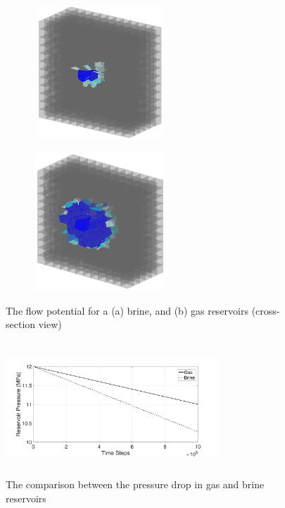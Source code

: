 \begin{figure}[!ht]
\begin{subfigure}[c]{0.48\textwidth}
\centering
\includegraphics[width=5cm,height=5cm]{figures/Amir_ME4_Brine_Flow.png}
\subcaption{}
\label{fig:Amir_ME4_Brine_Flow}
\end{subfigure}
\hfill
\begin{subfigure}[c]{0.48\textwidth}
\centering
\includegraphics[width=5cm,height=5.2cm]{figures/Amir_ME4_Gas_Flow.png}
\subcaption{}
\label{fig:Amir_ME4_Gas_Flow}
\end{subfigure}
\caption{The flow potential for a (a) brine, and (b) gas reservoirs (cross-section view)}
\end{figure}

\begin{figure}[!ht]
\centering
\includegraphics[width=8cm,height=5cm]{figures/Amir_ME4_Pressure.png}
\caption{The comparison between the pressure drop in gas and brine reservoirs}
\label{fig:Amir_ME4_Pressure}
\end{figure}



